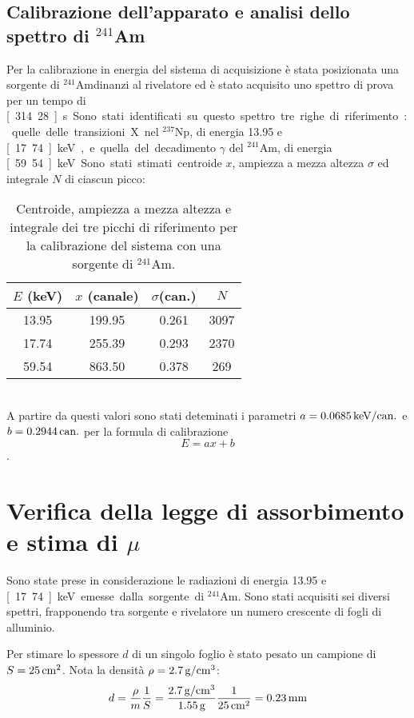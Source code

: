 \documentclass[italian,a4paper]{article}
\newcommand{\g}{\gamma}
\newcommand{\s}{\sigma}
\newcommand{\Am}{$^{241}$Am}
\newcommand{\Np}{$^{237}$Np}
\begin{document}

\subsection*{Calibrazione dell'apparato e analisi dello spettro di \Am}
Per la calibrazione in energia del sistema di acquisizione è stata posizionata una sorgente di \Am dinanzi al rivelatore ed è stato acquisito uno spettro di prova per un tempo di \unit[314.28]{s}.
Sono stati identificati su questo spettro tre righe di riferimento: quelle delle transizioni X nel \Np, di energia 13.95 e \unit[17.74]{keV}, e quella del decadimento $\g$ del \Am, di energia \unit[59.54]{keV}. Sono stati stimati centroide $x$, ampiezza a mezza altezza $\s$ ed integrale $N$ di ciascun picco: %
\begin{table}[h!]\centering
\begin{tabular}{*4c}
$E$ (keV)&		$x$ (canale)&		$\s$(can.)&	$N$\\\hline
13.95&			199.95&			0.261&		3097\\
17.74&			255.39&			0.293&		2370\\
59.54&			863.50&			0.378&		269
\end{tabular}
\caption{Centroide, ampiezza a mezza altezza e integrale dei tre picchi di riferimento per la calibrazione del sistema con una sorgente di \Am.}\label{calib}
\end{table}\\
A partire da questi valori sono stati deteminati i parametri $a = \unit[0.0685]{keV / can.}$ e $b=\unit[0.2944]{can.}$ per la formula di calibrazione
\begin{equation}
E = a x + b
\end{equation}.


\section{Verifica della legge di assorbimento e stima di $\mu$}
Sono state prese in considerazione le radiazioni di energia 13.95 e \unit[17.74]{keV} emesse dalla sorgente di \Am. Sono stati acquisiti sei diversi spettri, frapponendo tra sorgente e rivelatore un numero crescente di fogli di alluminio.

Per stimare lo spessore $d$ di un singolo foglio è stato pesato un campione di $S = \unit[25]{cm^{2}}$. Nota la densità $\rho = \unit[2.7]{g / cm^{3}}$:
\begin{equation}
d = \frac{\rho}{m}\frac{1}{S} = \frac{\unit[2.7]{g / cm^{3}}}{\unit[1.55]{g}} \frac{1}{ \unit[25]{cm^{2}}}= \unit[0.23]{mm}
\end{equation}
\end{document}
